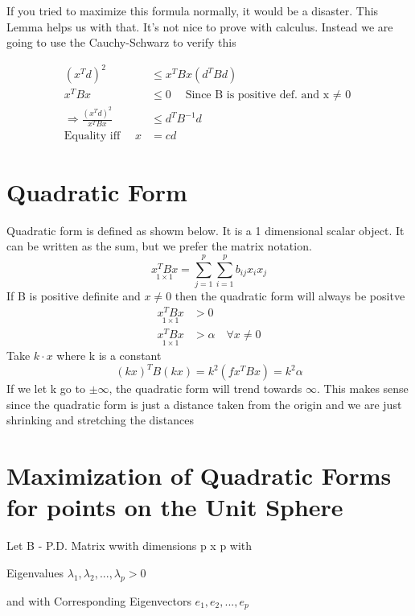 If you tried to maximize this formula normally, it would be a disaster. This Lemma helps us with that. It's not nice to prove with calculus. Instead we are going to use the Cauchy-Schwarz to verify this

\begin{align*}
    (x^Td)^2 &\leq x^TBx(d^TBd) \\
    x^TBx &\leq 0 \quad \text{Since B is positive def. and x $\neq$ 0}\\
    \Rightarrow \frac{(x^Td)^2}{x^TBx}
    &\leq d^TB^{-1}d \\
    \text{Equality iff }\quad x &= cd
\end{align*}

\section{Quadratic Form}
Quadratic form is defined as showm below. It is a 1 dimensional scalar object. It can be written as the sum, but we prefer the matrix notation.
\begin{equation*}
    \underset{1 \times 1}{x^TBx} = \displaystyle\sum_{j=1}^{p}\displaystyle\sum_{i=1}^{p}b_{ij}x_ix_j
\end{equation*}
If B is positive definite and $x\neq 0$ then the quadratic form will always be positve
\begin{align*}
    \underset{1 \times 1}{x^TBx} &> 0\\
    \underset{1 \times 1}{x^TBx} &> \alpha \quad \forall x \neq 0 
\end{align*}
Take $k\cdot x$ where k is a constant
\begin{equation*}
    (kx)^TB(kx) = k^2(fx^TBx) =k^2\alpha
\end{equation*}
If we let k go to $\pm \infty$, the quadratic form will trend towards $\infty$. This makes sense since the quadratic form is just a distance taken from the origin and we are just shrinking and stretching the distances

\section{Maximization of Quadratic Forms for points on the Unit Sphere}

Let B - P.D. Matrix wwith dimensions p x p with 

Eigenvalues $\lambda_1,\lambda_2,...,\lambda_p >0$

and with Corresponding Eigenvectors $e_1,e_2,...,e_p$

